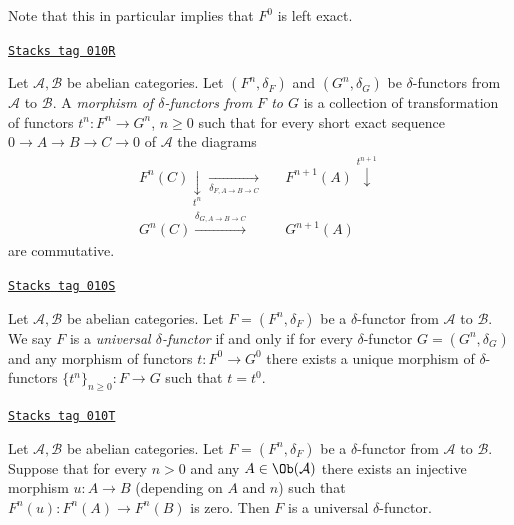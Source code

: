 Note that this in particular implies that $F^0$ is left exact.

\begin{definition}
\label{homology-definition-morphism-delta-functors}
\href{https://stacks.math.columbia.edu/tag/010R}{\texttt{Stacks tag 010R}}

Let $\mathcal{A}, \mathcal{B}$ be abelian categories.
Let $(F^n, \delta_F)$ and $(G^n, \delta_G)$ be $\delta$-functors
from $\mathcal{A}$ to $\mathcal{B}$. A {\it morphism of $\delta$-functors
from $F$ to $G$} is a collection of
transformation of functors $t^n : F^n \to G^n$, $n \geq 0$ such
that for every short exact sequence $0 \to A \to B \to C \to 0$
of $\mathcal{A}$ the diagrams
$$
\begin{array}{ccc}F^n(C) \underset{t^n}{\downarrow}\underset{\delta_{F, A \to B \to C}}{\longrightarrow} &  & F^{n + 1}(A) \overset{t^{n + 1}}{\downarrow} \\ G^n(C) \overset{\delta_{G, A \to B \to C}}{\longrightarrow} &  & G^{n + 1}(A)\end{array}
$$
are commutative.
\end{definition}

\begin{definition}
\label{homology-definition-universal-delta-functor}
\href{https://stacks.math.columbia.edu/tag/010S}{\texttt{Stacks tag 010S}}

Let $\mathcal{A}, \mathcal{B}$ be abelian categories.
Let $F = (F^n, \delta_F)$ be a $\delta$-functor
from $\mathcal{A}$ to $\mathcal{B}$.
We say $F$ is a {\it universal $\delta$-functor} if and only
if for every $\delta$-functor $G = (G^n, \delta_G)$ and any
morphism of functors $t : F^0 \to G^0$ there exists
a unique morphism of $\delta$-functors $\{t^n\}_{n \geq 0} : F \to G$
such that $t = t^0$.
\end{definition}

\begin{lemma}
\label{homology-lemma-efface-implies-universal}
\href{https://stacks.math.columbia.edu/tag/010T}{\texttt{Stacks tag 010T}}

Let $\mathcal{A}, \mathcal{B}$ be abelian categories.
Let $F = (F^n, \delta_F)$ be a $\delta$-functor
from $\mathcal{A}$ to $\mathcal{B}$.
Suppose that for every $n > 0$ and any $A \in \Ob(\mathcal{A})$
there exists an injective morphism $u : A \to B$ (depending on $A$ and $n$)
such that $F^n(u) : F^n(A) \to F^n(B)$ is zero. Then $F$ is a universal
$\delta$-functor.
\end{lemma}

